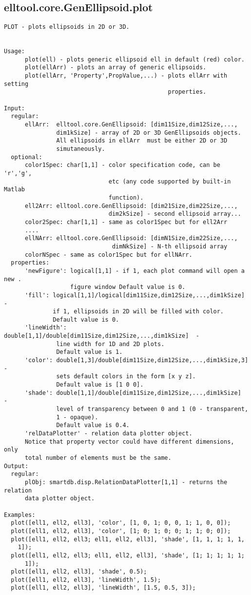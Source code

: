 \subsection{\texorpdfstring{elltool.core.GenEllipsoid.plot}{plot}}\label{method:elltool.core.GenEllipsoid.plot}
\begin{verbatim}
PLOT - plots ellipsoids in 2D or 3D.


Usage:
      plot(ell) - plots generic ellipsoid ell in default (red) color.
      plot(ellArr) - plots an array of generic ellipsoids.
      plot(ellArr, 'Property',PropValue,...) - plots ellArr with setting
                                               properties.

Input:
  regular:
      ellArr:  elltool.core.GenEllipsoid: [dim11Size,dim12Size,...,
               dim1kSize] - array of 2D or 3D GenEllipsoids objects.
               All ellipsoids in ellArr  must be either 2D or 3D
               simutaneously.
  optional:
      color1Spec: char[1,1] - color specification code, can be 'r','g',
                              etc (any code supported by built-in Matlab
                              function).
      ell2Arr: elltool.core.GenEllipsoid: [dim21Size,dim22Size,...,
                              dim2kSize] - second ellipsoid array...
      color2Spec: char[1,1] - same as color1Spec but for ell2Arr
      ....
      ellNArr: elltool.core.GenEllipsoid: [dimN1Size,dim22Size,...,
                               dimNkSize] - N-th ellipsoid array
      colorNSpec - same as color1Spec but for ellNArr.
  properties:
      'newFigure': logical[1,1] - if 1, each plot command will open a new .
                   figure window Default value is 0.
      'fill': logical[1,1]/logical[dim11Size,dim12Size,...,dim1kSize]  -
              if 1, ellipsoids in 2D will be filled with color.
              Default value is 0.
      'lineWidth': double[1,1]/double[dim11Size,dim12Size,...,dim1kSize]  -
               line width for 1D and 2D plots.
               Default value is 1.
      'color': double[1,3]/double[dim11Size,dim12Size,...,dim1kSize,3] -
               sets default colors in the form [x y z].
               Default value is [1 0 0].
      'shade': double[1,1]/double[dim11Size,dim12Size,...,dim1kSize]  -
               level of transparency between 0 and 1 (0 - transparent,
               1 - opaque).
               Default value is 0.4.
      'relDataPlotter' - relation data plotter object.
      Notice that property vector could have different dimensions, only
      total number of elements must be the same.
Output:
  regular:
      plObj: smartdb.disp.RelationDataPlotter[1,1] - returns the relation
      data plotter object.

Examples:
  plot([ell1, ell2, ell3], 'color', [1, 0, 1; 0, 0, 1; 1, 0, 0]);
  plot([ell1, ell2, ell3], 'color', [1; 0; 1; 0; 0; 1; 1; 0; 0]);
  plot([ell1, ell2, ell3; ell1, ell2, ell3], 'shade', [1, 1, 1; 1, 1,
    1]);
  plot([ell1, ell2, ell3; ell1, ell2, ell3], 'shade', [1; 1; 1; 1; 1;
      1]);
  plot([ell1, ell2, ell3], 'shade', 0.5);
  plot([ell1, ell2, ell3], 'lineWidth', 1.5);
  plot([ell1, ell2, ell3], 'lineWidth', [1.5, 0.5, 3]);
\end{verbatim}
